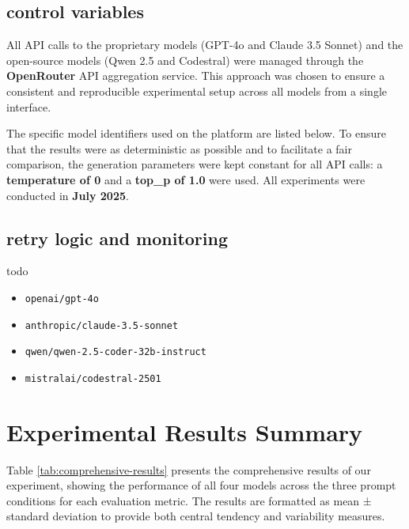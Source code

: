 \subsection{control variables}
\label{sec:implementation-details}

All API calls to the proprietary models (GPT-4o and Claude 3.5 Sonnet) and the open-source models (Qwen 2.5 and Codestral) were managed through the \textbf{OpenRouter} API aggregation service. This approach was chosen to ensure a consistent and reproducible experimental setup across all models from a single interface.

The specific model identifiers used on the platform are listed below. To ensure that the results were as deterministic as possible and to facilitate a fair comparison, the generation parameters were kept constant for all API calls: a \textbf{temperature of 0} and a \textbf{top\_p of 1.0} were used. All experiments were conducted in \textbf{July 2025}.
\subsection{retry logic and monitoring}

todo
\begin{itemize}
    \item \texttt{openai/gpt-4o}
    \item \texttt{anthropic/claude-3.5-sonnet}
    \item \texttt{qwen/qwen-2.5-coder-32b-instruct} 
    \item \texttt{mistralai/codestral-2501}
\end{itemize}

\section{Experimental Results Summary}
Table \ref{tab:comprehensive-results} presents the comprehensive results of our experiment, showing the performance of all four models across the three prompt conditions for each evaluation metric. The results are formatted as mean ± standard deviation to provide both central tendency and variability measures.

